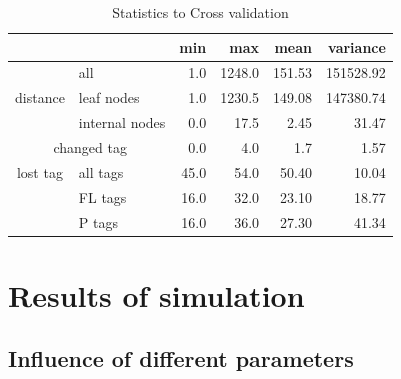       \begin{table}
        \begin{center}
          \begin{tabular}{ |cl||r|r|r|r| }
            \hline
            & & min & max & mean & variance \\
            \hline \hline
            \multirow{3}{*}{distance} & all & 1.0 & 1248.0 & 151.53 & 151528.92 \\
            & leaf nodes                    & 1.0 & 1230.5 & 149.08 & 147380.74 \\
            & internal nodes                & 0.0 & 17.5 & 2.45 & 31.47 \\ \hline
            \multicolumn{2}{|c||}{changed tag} & 0.0 & 4.0 & 1.7 & 1.57 \\ \hline
            lost tag & all tags             & 45.0 & 54.0 & \cellcolor{green!50}50.40 & 10.04 \\
            & FL tags                       & 16.0 & 32.0 & 23.10 & 18.77 \\
            & P tags                        & 16.0 & 36.0 & 27.30 & 41.34 \\
            \hline
          \end{tabular}
        \end{center}
        \caption{Statistics to Cross validation}
      \end{table}

  \section{Results of simulation}

    \subsection{Influence of different parameters}

